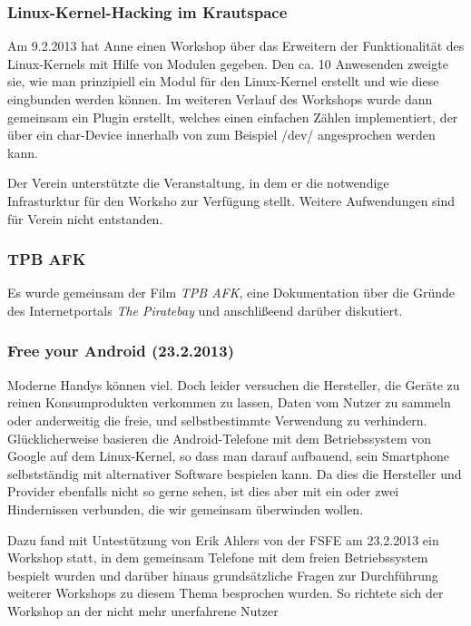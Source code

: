 \documentclass[10pt,DIV16]{scrartcl}
\begin{document}
\subsubsection{Linux-Kernel-Hacking im Krautspace}

Am 9.2.2013 hat Anne einen Workshop über das Erweitern der
Funktionalität des Linux-Kernels mit Hilfe von Modulen gegeben. Den
ca. 10 Anwesenden zweigte sie, wie man prinzipiell ein Modul für den
Linux-Kernel erstellt und wie diese eingbunden werden können. Im
weiteren Verlauf des Workshops wurde dann gemeinsam ein Plugin
erstellt, welches einen einfachen Zählen implementiert, der über ein
char-Device innerhalb von zum Beispiel /dev/ angesprochen werden
kann.

Der Verein unterstützte die Veranstaltung, in dem er die notwendige
Infrasturktur für den Worksho zur Verfügung stellt. Weitere
Aufwendungen sind für Verein nicht entstanden.

\subsubsection{TPB AFK}

Es wurde gemeinsam der Film \textit{TPB AFK}, eine Dokumentation
über die Gründe des Internetportals \textit {The Piratebay} und
anschlißeend darüber diskutiert.

\subsubsection{Free your Android (23.2.2013)}

Moderne Handys können viel. Doch leider versuchen die Hersteller,
die Geräte zu reinen Konsumprodukten verkommen zu lassen, Daten vom
Nutzer zu sammeln oder anderweitig die freie, und selbstbestimmte
Verwendung zu verhindern. Glücklicherweise basieren die
Android-Telefone mit dem Betriebssystem von Google auf dem
Linux-Kernel, so dass man darauf aufbauend, sein Smartphone
selbstständig mit alternativer Software bespielen kann. Da dies die
Hersteller und Provider ebenfalls nicht so gerne sehen, ist dies
aber mit ein oder zwei Hindernissen verbunden, die wir gemeinsam
überwinden wollen.

Dazu fand mit Untestützung von Erik Ahlers von der FSFE am 23.2.2013
ein Workshop statt, in dem gemeinsam Telefone mit dem freien
Betriebssystem bespielt wurden und darüber hinaus grundsätzliche
Fragen zur Durchführung weiterer Workshops zu diesem Thema
besprochen wurden. So richtete sich der Workshop an der nicht mehr
unerfahrene Nutzer
\end{document}
